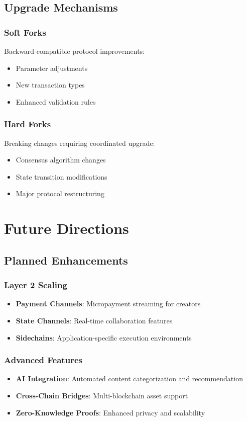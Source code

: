 \documentclass[11pt,a4paper]{article}
\begin{document}
\subsection{Upgrade Mechanisms}

\subsubsection{Soft Forks}
Backward-compatible protocol improvements:
\begin{itemize}
  \item Parameter adjustments
  \item New transaction types
  \item Enhanced validation rules
\end{itemize}

\subsubsection{Hard Forks}
Breaking changes requiring coordinated upgrade:
\begin{itemize}
  \item Consensus algorithm changes
  \item State transition modifications
  \item Major protocol restructuring
\end{itemize}

\section{Future Directions}

\subsection{Planned Enhancements}

\subsubsection{Layer 2 Scaling}
\begin{itemize}
  \item \textbf{Payment Channels}: Micropayment streaming for creators
  \item \textbf{State Channels}: Real-time collaboration features
  \item \textbf{Sidechains}: Application-specific execution environments
\end{itemize}

\subsubsection{Advanced Features}
\begin{itemize}
  \item \textbf{AI Integration}: Automated content categorization and recommendation
  \item \textbf{Cross-Chain Bridges}: Multi-blockchain asset support
  \item \textbf{Zero-Knowledge Proofs}: Enhanced privacy and scalability
\end{itemize}
\end{document}
